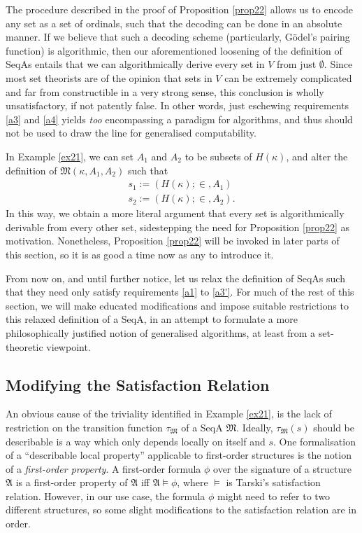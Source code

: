 \documentclass[12pt]{article}
\numberwithin{equation}{section}
\begin{document}
The procedure described in the proof of Proposition \ref{prop22} allows us to encode any set as a set of ordinals, such that the decoding can be done in an absolute manner. If we believe that such a decoding scheme (particularly, G\"{o}del's pairing function) is algorithmic, then our aforementioned loosening of the definition of SeqAs entails that we can algorithmically derive every set in $V$ from just $\emptyset$. Since most set theorists are of the opinion that sets in $V$ can be extremely complicated and far from constructible in a very strong sense, this conclusion is wholly unsatisfactory, if not patently false. In other words, just eschewing requirements \ref{a3} and \ref{a4} yields \emph{too} encompassing a paradigm for algorithms, and thus should not be used to draw the line for generalised computability.

\begin{rem}
In Example \ref{ex21}, we can set $A_1$ and $A_2$ to be subsets of $H(\kappa)$, and alter the definition of $\mathfrak{M}(\kappa, A_1, A_2)$ such that 
\begin{gather*}
    s_1 := (H(\kappa); \in, A_1) \\
    s_2 := (H(\kappa); \in, A_2) \text{.}
\end{gather*}
In this way, we obtain a more literal argument that every set is algorithmically derivable from every other set, sidestepping the need for Proposition \ref{prop22} as motivation. Nonetheless, Proposition \ref{prop22} will be invoked in later parts of this section, so it is as good a time now as any to introduce it.
\end{rem}

From now on, and until further notice, let us relax the definition of SeqAs such that they need only satisfy requirements \ref{a1} to \ref{a3'}. For much of the rest of this section, we will make educated modifications and impose suitable restrictions to this relaxed definition of a SeqA, in an attempt to formulate a more philosophically justified notion of generalised algorithms, at least from a set-theoretic viewpoint.

\subsection{Modifying the Satisfaction Relation}

An obvious cause of the triviality identified in Example \ref{ex21}, is the lack of restriction on the transition function $\tau_{\mathfrak{M}}$ of a SeqA $\mathfrak{M}$. Ideally, $\tau_{\mathfrak{M}}(s)$ should be describable is a way which only depends locally on itself and $s$. One formalisation of a ``describable local property'' applicable to first-order structures is the notion of a \emph{first-order property}. A first-order formula $\phi$ over the signature of a structure $\mathfrak{A}$ is a first-order property of $\mathfrak{A}$ iff $\mathfrak{A} \models \phi$, where $\models$ is Tarski's satisfaction relation. However, in our use case, the formula $\phi$ might need to refer to two different structures, so some slight modifications to the satisfaction relation are in order.
\end{document}
